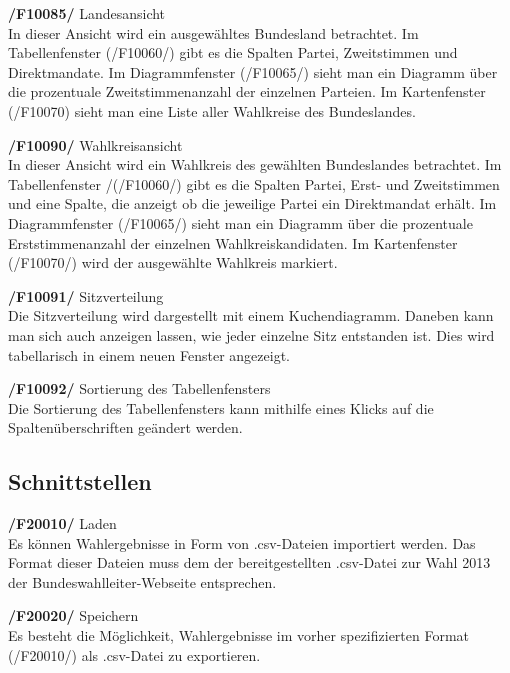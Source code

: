 \documentclass[10pt,a4paper]{article}
\begin{document}
\begin{description}
	\item \textbf{/F10085/} Landesansicht \hfill \\
	In dieser Ansicht wird ein ausgewähltes Bundesland betrachtet. Im Tabellenfenster (/F10060/) gibt es die Spalten Partei, Zweitstimmen und Direktmandate. Im Diagrammfenster (/F10065/) sieht man ein Diagramm über die prozentuale Zweitstimmenanzahl der einzelnen Parteien. Im Kartenfenster (/F10070) sieht man eine Liste aller Wahlkreise des Bundeslandes. \hfill \\
	\item \textbf{/F10090/} Wahlkreisansicht \hfill \\
	In dieser Ansicht wird ein Wahlkreis des gewählten Bundeslandes betrachtet. Im Tabellenfenster /(/F10060/) gibt es die  Spalten Partei, Erst- und Zweitstimmen und eine Spalte, die anzeigt ob die jeweilige Partei ein Direktmandat erhält. Im Diagrammfenster (/F10065/) sieht man ein Diagramm über die prozentuale Erststimmenanzahl der einzelnen Wahlkreiskandidaten. Im Kartenfenster (/F10070/) wird der ausgewählte Wahlkreis markiert. \hfill \\
	\item \textbf{/F10091/} Sitzverteilung \hfill \\
	Die Sitzverteilung wird dargestellt mit einem Kuchendiagramm. Daneben kann man sich auch anzeigen lassen, wie jeder einzelne Sitz entstanden ist. Dies wird tabellarisch in einem neuen Fenster angezeigt. \hfill \\
	\item \textbf{/F10092/} Sortierung des Tabellenfensters \hfill \\
	Die Sortierung des Tabellenfensters kann mithilfe eines Klicks auf die Spaltenüberschriften geändert werden. \hfill \\
\end{description}

\subsection{Schnittstellen}
\begin{description}
	\item \textbf{/F20010/} Laden \hfill \\
	Es können Wahlergebnisse in Form von .csv-Dateien importiert werden. Das Format dieser Dateien muss dem der bereitgestellten .csv-Datei zur Wahl 2013 der Bundeswahlleiter-Webseite entsprechen.
	\item \textbf{/F20020/} Speichern \hfill \\
	Es besteht die Möglichkeit, Wahlergebnisse im vorher spezifizierten Format (/F20010/) als .csv-Datei zu exportieren.
\end{description}
\end{document}
